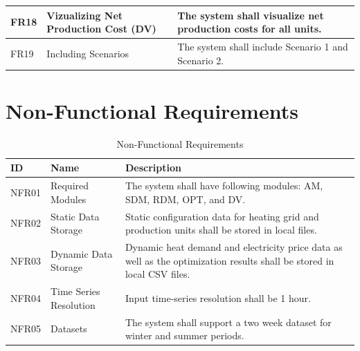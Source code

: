\begin{table}[H]
    \centering
    \begin{tabular}{|p{1.3cm}|p{3.5cm}|p{9.5cm}|}   
        \hline
        FR18 & Vizualizing Net Production Cost (DV) & The system shall visualize net production costs for all units. \\
        \hline
        FR19 & Including Scenarios & The system shall include Scenario 1 and Scenario 2. \\
        \hline
    \end{tabular}
\end{table}

\section*{Non-Functional Requirements}

\begin{table}[H]
    \centering
    \caption{Non-Functional Requirements}
    \begin{tabular}{|p{1.3cm}|p{3.5cm}|p{9.5cm}|}   
        \hline
        \cellcolor[HTML]{BFBFBF} ID & \cellcolor[HTML]{BFBFBF} Name & \cellcolor[HTML]{BFBFBF} Description \\
        \hline
        NFR01 & Required Modules & The system shall have following modules: AM, SDM, RDM, OPT, and DV. \\
        \hline
        NFR02 & Static Data Storage & Static configuration data for heating grid and production units shall be stored in local files. \\
        \hline
        NFR03 & Dynamic Data Storage & Dynamic heat demand and electricity price data as well as the optimization results shall be stored in local CSV files. \\
        \hline
        NFR04 & Time Series Resolution & Input time-series resolution shall be 1 hour. \\
        \hline
        NFR05 & Datasets & The system shall support a two week dataset for winter and summer periods. \\
        \hline
    \end{tabular}
\end{table}
